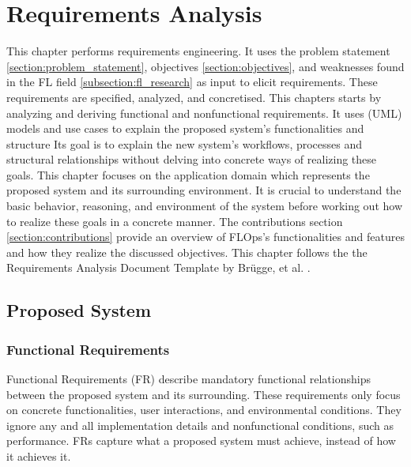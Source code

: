 \chapter{Requirements Analysis}

This chapter performs requirements engineering.
It uses the problem statement \ref{section:problem_statement}, objectives \ref{section:objectives}, and weaknesses found in the FL field \ref{subsection:fl_research} as input to elicit requirements.
These requirements are specified, analyzed, and concretised. 
This chapters starts by analyzing and deriving functional and nonfunctional requirements.
It uses (UML) models and use cases to explain the proposed system's functionalities and structure
Its goal is to explain the new system's workflows, processes and structural relationships without delving into concrete ways of realizing these goals.
This chapter focuses on the application domain which represents the proposed system and its surrounding environment.
It is crucial to understand the basic behavior, reasoning, and environment of the system before working out how to realize these goals in a concrete manner.
The contributions section \ref{section:contributions} provide an overview of FLOps's functionalities and features and how they realize the discussed objectives.
This chapter follows the the Requirements Analysis Document Template by Brügge, et al. \cite{book:bruegge}.

\section{Proposed System}

\subsection{Functional Requirements}
Functional Requirements (FR) describe mandatory functional relationships between the proposed system and its surrounding.
These requirements only focus on concrete functionalities, user interactions, and environmental conditions.
They ignore any and all implementation details and nonfunctional conditions, such as performance.
FRs capture what a proposed system must achieve, instead of how it achieves it. \cite{book:bruegge}

